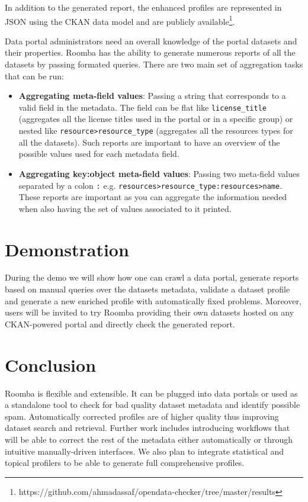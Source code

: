 \documentclass{sig-alternate}
\begin{document}
In addition to the generated report, the enhanced profiles are represented in JSON using the CKAN data model and are publicly available\footnote{https://github.com/ahmadassaf/opendata-checker/tree/master/results}.

Data portal administrators need an overall knowledge of the portal datasets and their properties. Roomba has the ability to generate numerous reports of all the datasets by passing formated queries. There are two main set of aggregation tasks that can be run:
\begin{itemize}
  \item \textbf{Aggregating meta-field values}: Passing a string that corresponds to a valid field in the metadata. The field can be flat like \texttt{license\_title} (aggregates all the license titles used in the portal or in a specific group) or nested like \texttt{resource>resource\_type} (aggregates all the resources types for all the datasets). Such reports are important to have an overview of the possible values used for each metadata field.
  \item \textbf{Aggregating key:object meta-field values}: Passing two meta-field values separated by a colon \texttt{:} e.g. \texttt{resources>resource\_type:resources>name}. These reports are important as you can aggregate the information needed when also having the set of values associated to it printed.
\end{itemize}

\section{Demonstration}
During the demo we will show how one can crawl a data portal, generate reports based on manual queries over the datasets metadata, validate a dataset profile and generate a new enriched profile with automatically fixed problems. Moreover, users will be invited to try Roomba providing their own datasets hosted on any CKAN-powered portal and directly check the generated report.

\section{Conclusion}
Roomba is flexible and extensible. It can be plugged into data portals or used as a standalone tool to check for bad quality dataset metadata and identify possible spam. Automatically corrected profiles are of higher quality thus improving dataset search and retrieval. Further work includes introducing workflows that will be able to correct the rest of the metadata either automatically or through intuitive manually-driven interfaces. We also plan to integrate statistical and topical profilers to be able to generate full comprehensive profiles.



\end{document}
